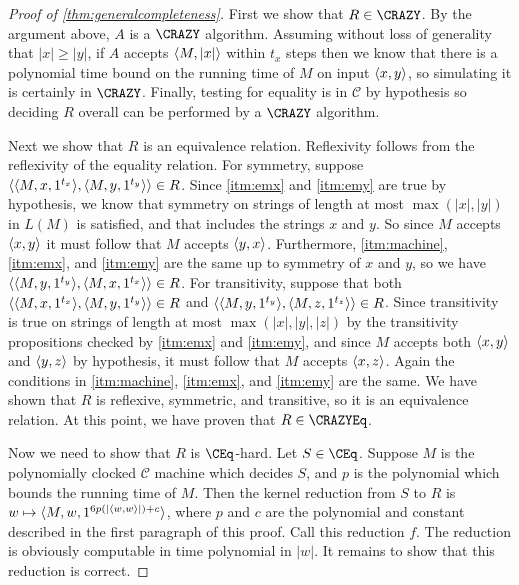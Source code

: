 \begin{proof}[Proof of \autoref{thm:generalcompleteness}]
  First we show that $R\in\CRAZY$.
  By the argument above, $A$ is a $\CRAZY$ algorithm.
  Assuming without loss of generality that $|x|\geq |y|$, if $A$ accepts $\langle M,|x|\rangle$ within $t_x$ steps then we know that there is a polynomial time bound on the running time of $M$ on input $\langle x,y\rangle$, so simulating it is certainly in $\CRAZY$.
  Finally, testing for equality is in $\mathcal{C}$ by hypothesis so deciding $R$ overall can be performed by a $\CRAZY$ algorithm.

  Next we show that $R$ is an equivalence relation.
  Reflexivity follows from the reflexivity of the equality relation.
  For symmetry, suppose $\langle\langle M,x,1^{t_x}\rangle,\langle M,y,1^{t_y}\rangle\rangle\in R$.
  Since \autoref{itm:emx} and \autoref{itm:emy} are true by hypothesis, we know that symmetry on strings of length at most $\max(|x|, |y|)$ in $L(M)$ is satisfied, and that includes the strings $x$ and $y$.
  So since $M$ accepts $\langle x,y\rangle$ it must follow that $M$ accepts $\langle y,x\rangle$.
  Furthermore, \autoref{itm:machine}, \autoref{itm:emx}, and \autoref{itm:emy} are the same up to symmetry of $x$ and $y$, so we have $\langle\langle M,y,1^{t_y}\rangle,\langle M,x,1^{t_x}\rangle\rangle\in R$.
  For transitivity, suppose that both $\langle\langle M,x,1^{t_x}\rangle,\langle M,y,1^{t_y}\rangle\rangle\in R$ and $\langle\langle M,y,1^{t_y}\rangle,\langle M,z,1^{t_z}\rangle\rangle\in R$.
  Since transitivity is true on strings of length at most $\max(|x|, |y|, |z|)$ by the transitivity propositions checked by \autoref{itm:emx} and \autoref{itm:emy}, and since $M$ accepts both $\langle x,y\rangle$ and $\langle y,z\rangle$ by hypothesis, it must follow that $M$ accepts $\langle x,z\rangle$.
  Again the conditions in \autoref{itm:machine}, \autoref{itm:emx}, and \autoref{itm:emy} are the same.
  We have shown that $R$ is reflexive, symmetric, and transitive, so it is an equivalence relation.
  At this point, we have proven that $R\in\CRAZYEq$.

  Now we need to show that $R$ is $\CEq$-hard.
  Let $S\in\CEq$.
  Suppose $M$ is the polynomially clocked $\mathcal{C}$ machine which decides $S$, and $p$ is the polynomial which bounds the running time of $M$.
  Then the kernel reduction from $S$ to $R$ is $w\mapsto\langle M,w,1^{6p(|\langle w,w\rangle|)+c}\rangle$, where $p$ and $c$ are the polynomial and constant described in the first paragraph of this proof.
  Call this reduction $f$.
  The reduction is obviously computable in time polynomial in $|w|$.
  It remains to show that this reduction is correct.


\end{proof}
